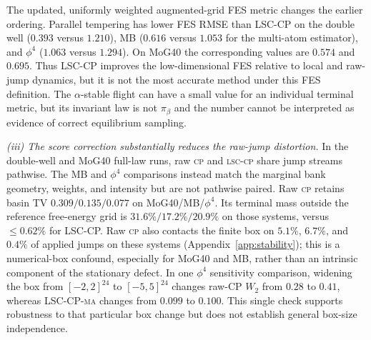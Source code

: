 \documentclass[11pt]{article}
\newcommand{\piB}{\pi_\beta}
\begin{document}
The updated, uniformly weighted augmented-grid FES metric changes the earlier
ordering.  Parallel tempering has lower FES RMSE than LSC-CP on the double well
($0.393$ versus $1.210$), MB ($0.616$ versus $1.053$ for the multi-atom
estimator), and $\phi^4$ ($1.063$ versus $1.294$).  On MoG40 the corresponding
values are $0.574$ and $0.695$.  Thus LSC-CP improves the low-dimensional FES
relative to local and raw-jump dynamics, but it is not the most accurate method
under this FES definition.  The $\alpha$-stable flight can have a small value
for an individual terminal metric, but its invariant law is not $\piB$ and the
number cannot be interpreted as evidence of correct equilibrium sampling.

\emph{(iii) The score correction substantially reduces the raw-jump
distortion.}
In the double-well and MoG40 full-law runs, raw \textsc{cp} and
\textsc{lsc-cp} share jump streams pathwise.  The MB and $\phi^4$ comparisons
instead match the marginal bank geometry, weights, and intensity but are not
pathwise paired.  Raw \textsc{cp} retains basin TV $0.309/0.135/0.077$ on
MoG40/MB/$\phi^4$.  Its terminal mass outside the reference free-energy grid is
$31.6\%/17.2\%/20.9\%$ on those systems, versus
$\le0.62\%$ for LSC-CP.  Raw \textsc{cp} also contacts the finite box on
$5.1\%$, $6.7\%$, and $0.4\%$ of applied jumps on these systems
(Appendix~\ref{app:stability}); this is a numerical-box confound, especially
for MoG40 and MB, rather than an intrinsic component of the stationary
defect.  In one $\phi^4$ sensitivity comparison, widening the box from
$[-2,2]^{24}$ to $[-5,5]^{24}$ changes raw-CP $W_2$ from $0.28$ to $0.41$,
whereas LSC-CP-\textsc{ma} changes from $0.099$ to $0.100$.  This single check
supports robustness to that particular box change but does not establish
general box-size independence.
\end{document}
